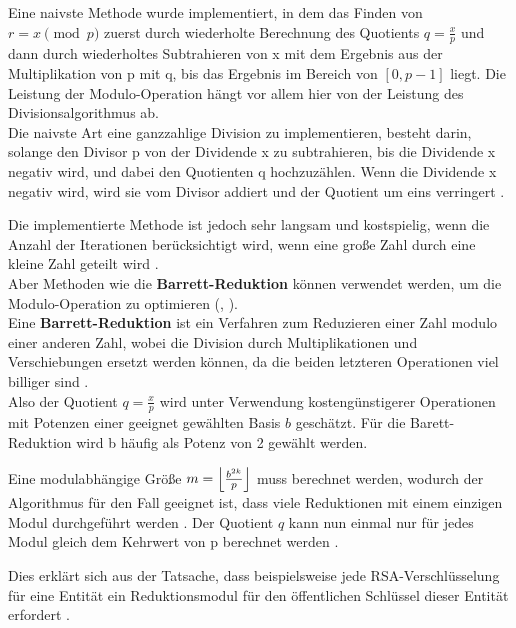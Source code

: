 Eine naivste Methode wurde implementiert, in dem das Finden von $ r = x \pmod p $ zuerst
durch wiederholte Berechnung des Quotients $ q = \frac{x}{p} $ und dann durch
wiederholtes Subtrahieren von x mit dem Ergebnis aus der Multiplikation von p mit q, bis das Ergebnis im Bereich von $ [0, p - 1] $ liegt.
Die Leistung der Modulo-Operation hängt vor allem hier von der Leistung des Divisionsalgorithmus ab. \\

Die naivste Art eine ganzzahlige Division zu implementieren, besteht darin,
solange den Divisor p von der Dividende x zu subtrahieren, bis die Dividende x negativ wird, und dabei den Quotienten q hochzuzählen. Wenn die Dividende x negativ wird, wird sie vom Divisor addiert und der Quotient um eins verringert \cite{bericht}. 

Die implementierte Methode ist jedoch sehr langsam und kostspielig, wenn die Anzahl der Iterationen berücksichtigt wird, wenn eine große Zahl durch eine kleine Zahl geteilt wird 
\cite{barett}. \\

Aber Methoden wie die \textbf{Barrett-Reduktion} können verwendet werden, um die Modulo-Operation zu optimieren (\cite{anoops}, \cite{hasenplaugh}).\\

Eine \textbf{Barrett-Reduktion} ist ein Verfahren zum Reduzieren einer Zahl modulo einer anderen Zahl, wobei die Division durch Multiplikationen und Verschiebungen ersetzt werden können, da die beiden letzteren Operationen viel billiger sind \cite{patent}.\\
Also der Quotient  $ q = \frac{x}{p} $ wird unter Verwendung kostengünstigerer Operationen mit Potenzen einer geeignet gewählten Basis $ b $ geschätzt. Für die Barett-Reduktion wird b häufig als Potenz von 2 gewählt werden.

Eine modulabhängige Größe $ m = \floor*{\frac{b^{2k}}{p}} $ muss berechnet werden, wodurch der Algorithmus für den Fall geeignet ist, dass viele Reduktionen mit einem einzigen Modul durchgeführt werden \cite{Hankerson}. Der Quotient $ q $ kann nun einmal nur für jedes Modul gleich dem Kehrwert von p berechnet werden \cite{barett}.

Dies erklärt sich aus der Tatsache, dass beispielsweise jede RSA-Verschlüsselung für eine Entität ein Reduktionsmodul für den öffentlichen Schlüssel dieser Entität erfordert \cite{menezes:1997}. \\

